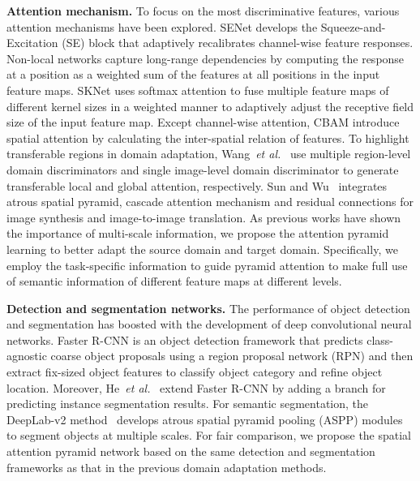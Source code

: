 \documentclass[runningheads]{llncs}
\def\etal{{\em et al.}}
\begin{document}
{\noindent \textbf{Attention mechanism.}} To focus on the most discriminative features, various attention mechanisms have been explored. SENet \cite{DBLP:conf/cvpr/HuSS18} develops the Squeeze-and-Excitation (SE) block that adaptively recalibrates channel-wise feature responses. Non-local networks \cite{DBLP:conf/cvpr/0004GGH18} capture long-range dependencies by computing the response at a position as a weighted sum of the features at all positions in the input feature maps. SKNet \cite{DBLP:conf/cvpr/LiW0019} uses softmax attention to fuse multiple feature maps of different kernel sizes in a weighted manner to adaptively adjust the receptive field size of the input feature map. Except channel-wise attention, CBAM \cite{DBLP:conf/eccv/WooPLK18} introduce spatial attention by calculating the inter-spatial relation of features. To highlight transferable regions in domain adaptation, Wang~\etal~\cite{DBLP:conf/aaai/WangLYLW19} use multiple region-level domain discriminators and single image-level domain discriminator to generate transferable local and global attention, respectively. Sun and Wu~\cite{DBLP:journals/corr/abs-1901-06322} integrates atrous spatial pyramid, cascade attention mechanism and residual connections for image synthesis and image-to-image translation. As previous works \cite{DBLP:conf/cvpr/SinghD18,DBLP:conf/cvpr/LinDGHHB17} have shown the importance of multi-scale information, we propose the attention pyramid learning to better adapt the source domain and target domain. Specifically, we employ the task-specific information to guide pyramid attention to make full use of semantic information of different feature maps at different levels.

{\noindent \textbf{Detection and segmentation networks.}} The performance of object detection and segmentation has boosted with the development of deep convolutional neural networks. Faster R-CNN \cite{DBLP:journals/pami/RenHG017} is an object detection framework that predicts class-agnostic coarse object proposals using a region proposal network (RPN) and then extract fix-sized object features to classify object category and refine object location. Moreover, He~\etal~\cite{DBLP:conf/iccv/HeGDG17} extend Faster R-CNN by adding a branch for predicting instance segmentation results. For semantic segmentation, the DeepLab-v2 method~\cite{DBLP:journals/pami/ChenPKMY18} develops atrous spatial pyramid pooling (ASPP) modules to segment objects at multiple scales. For fair comparison, we propose the spatial attention pyramid network based on the same detection and segmentation frameworks as that in the previous domain adaptation methods.
\end{document}
